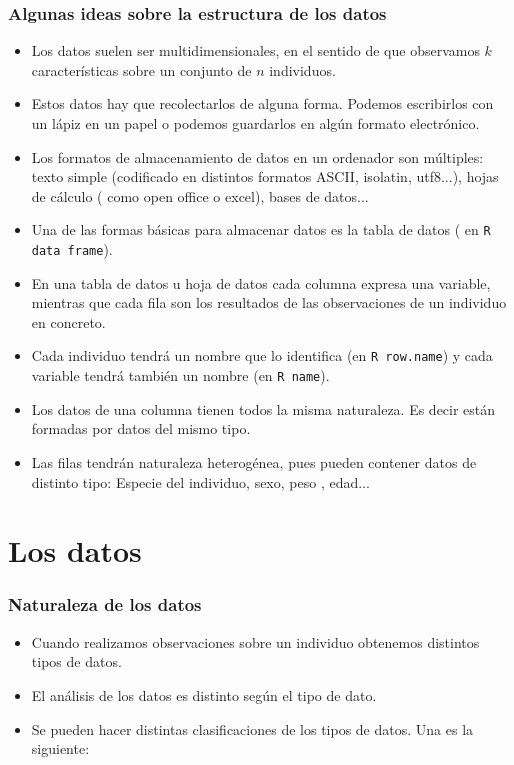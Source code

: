\begin{frame}
\frametitle{Algunas ideas sobre la estructura de los datos}
\begin{itemize}
 \item Los datos  suelen ser multidimensionales, en el sentido de que observamos $k$ características sobre un conjunto de $n$ individuos.
\item  Estos datos hay que recolectarlos de alguna forma. Podemos escribirlos con un lápiz en un papel o podemos guardarlos en algún formato electrónico.
\item Los formatos de almacenamiento de datos en un ordenador son múltiples: texto simple (codificado en distintos formatos ASCII, isolatin, utf8...), hojas de cálculo ( como open office o excel), bases de datos...
\item Una de las formas básicas para almacenar datos es la tabla de datos ( en \texttt{R} \texttt{data frame}). 
\end{itemize}
\end{frame}

\begin{frame}
\begin{itemize}
\item  En una tabla de datos u hoja de datos cada columna expresa una variable, mientras que cada fila son los resultados de las observaciones de un individuo en concreto.
\item Cada individuo tendrá un nombre que lo identifica (en \texttt{R row.name}) y cada variable tendrá también un nombre (en \texttt{R name}).
\item Los datos de una  columna tienen todos la misma naturaleza. Es decir están formadas por datos del mismo tipo.
\item Las filas tendrán naturaleza heterogénea, pues pueden contener datos de distinto tipo: Especie del individuo, sexo, peso , edad...
\end{itemize}
\end{frame}

\section{Los datos}
\begin{frame}
\frametitle{Naturaleza de los datos}
\begin{itemize}
\item Cuando realizamos observaciones sobre un individuo obtenemos distintos tipos de datos.
\item El análisis de los datos es distinto según el tipo de dato.
\item Se pueden hacer distintas clasificaciones de los tipos de datos. Una es la siguiente:
\end{itemize}
\end{frame}

